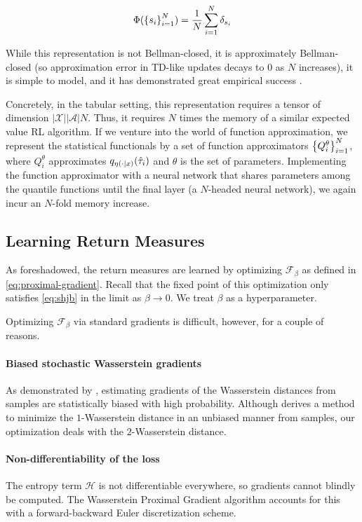 \begin{equation}
  \label{eq:deicide:imputation}
  \Phi(\indexedint{i}{N}{s}) = \frac{1}{N}\sum_{i=1}^N\dirac{s_i}
\end{equation}

While this representation is not Bellman-closed, it is approximately
Bellman-closed (so approximation error in TD-like updates decays to
$0$ as $N$ increases), it is simple to model, and it has demonstrated great
empirical success \citep{Dabney2018DistributionalRL}.

Concretely, in the tabular setting, this representation requires a
tensor of dimension $|\mathcal{X}||\mathcal{A}|N$. Thus, it requires
$N$ times the memory of a similar expected value RL algorithm. If we
venture into the world of function approximation, we represent the
statistical functionals by a set of function approximators
$\indexedint{i}{N}{Q^\theta}$, where $Q^\theta_i$ approximates
$\quantile{\returnmeasure(\cdot\mid x)}(\hat\tau_i)$ and $\theta$ is the
set of parameters. Implementing the function approximator with a
neural network that shares parameters among the quantile functions
until the final layer (a $N$-headed neural network), we again incur an
$N$-fold memory increase. 

\subsection{Learning Return Measures}\label{s:deicide:alg:learning}
As foreshadowed, the return measures are learned by optimizing
$\mathscr{F}_\beta$ as defined in \eqref{eq:proximal-gradient}. Recall
that the fixed point of this optimization only satisfies
\eqref{eq:shjb} in the limit as $\beta\to 0$. We treat $\beta$ as a hyperparameter.

Optimizing $\mathscr{F}_\beta$ via standard gradients is difficult,
however, for a couple of reasons.

\paragraph{Biased stochastic Wasserstein gradients}
As demonstrated by \citet{bellemare2017cramer}, estimating gradients
of the Wasserstein distances from samples are statistically biased
with high probability. Although \citet{Dabney2018DistributionalRL}
derives a method to minimize the $1$-Wasserstein distance in an
unbiased manner from samples, our optimization deals with the
$2$-Wasserstein distance.

\paragraph{Non-differentiability of the loss}
The entropy term $\mathcal{H}$ is not differentiable everywhere, so
gradients cannot blindly be computed. The Wasserstein Proximal
Gradient algorithm \citep{salim2020wasserstein} accounts for this with
a forward-backward Euler discretization scheme.

